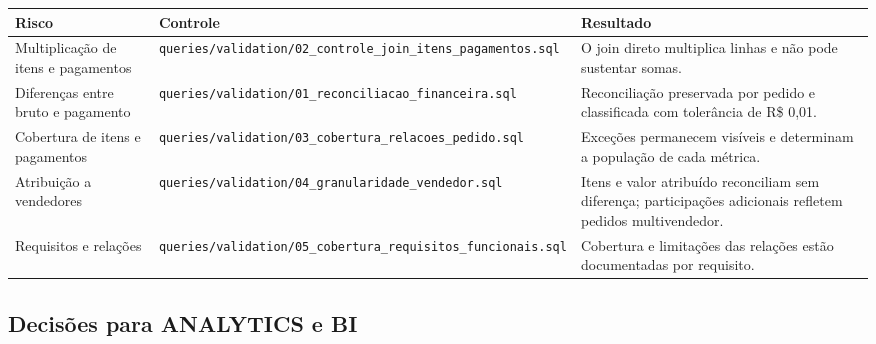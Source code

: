 \documentclass[12pt,a4paper]{article}
\newcounter{none}
\begin{document}
{\def\LTcaptype{none} %
\begin{longtable}[]{@{}
  >{\raggedright\arraybackslash}p{}
  >{\raggedright\arraybackslash}p{}
  >{\raggedright\arraybackslash}p{}@{}}
\toprule\noalign{}
\rowcolor{AzulCorporativo}
\begin{minipage}[b]{\linewidth}\raggedright\color{white}\bfseries
Risco
\end{minipage} & \begin{minipage}[b]{\linewidth}\raggedright\color{white}\bfseries
Controle
\end{minipage} & \begin{minipage}[b]{\linewidth}\raggedright\color{white}\bfseries
Resultado
\end{minipage} \\
\midrule\noalign{}
\endhead
\bottomrule\noalign{}
\endlastfoot
Multiplicação de itens e pagamentos &
\nolinkurl{queries/validation/02_controle_join_itens_pagamentos.sql} & O
join direto multiplica linhas e não pode sustentar somas. \\
Diferenças entre bruto e pagamento &
\nolinkurl{queries/validation/01_reconciliacao_financeira.sql} &
Reconciliação preservada por pedido e classificada com tolerância de R\$
0,01. \\
Cobertura de itens e pagamentos &
\nolinkurl{queries/validation/03_cobertura_relacoes_pedido.sql} &
Exceções permanecem visíveis e determinam a população de cada
métrica. \\
Atribuição a vendedores &
\nolinkurl{queries/validation/04_granularidade_vendedor.sql} & Itens e
valor atribuído reconciliam sem diferença; participações adicionais
refletem pedidos multivendedor. \\
Requisitos e relações &
\nolinkurl{queries/validation/05_cobertura_requisitos_funcionais.sql} &
Cobertura e limitações das relações estão documentadas por requisito. \\
\end{longtable}
}

\subsection{Decisões para ANALYTICS e
BI}\label{docs__analytics__catalogo_metricas_analiticas.md__decisuxf5es-para-analytics-e-bi}
\end{document}
